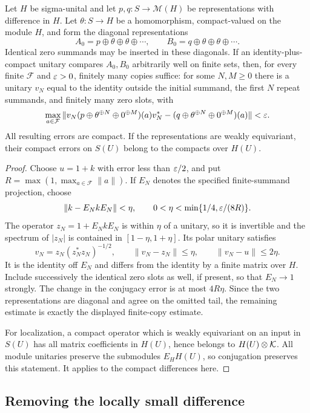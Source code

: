 \begin{lemma}
\label{un:finite-truncation}
Let $H$ be sigma-unital and let $p,q:S\to\mathcal M(H)$ be
representations with difference in $H$.  Let $\theta:S\to H$ be
a homomorphism, compact-valued on the module $H$, and form the diagonal
representations
\[
 A_0=p\oplus\theta\oplus\theta\oplus\cdots,
 \qquad B_0=q\oplus\theta\oplus\theta\oplus\cdots.
\]
Identical zero summands may be inserted in these diagonals.
If an identity-plus-compact unitary compares $A_0,B_0$ arbitrarily
well on finite sets, then, for every finite $\mathcal F$ and
$\varepsilon>0$, finitely many copies suffice: for some $N,M\geq0$ there is a
unitary $v_N$ equal to the identity outside the initial summand,
the first $N$ repeat summands, and finitely many zero slots, with
\[
 \max_{a\in\mathcal F}
 \|v_N(p\oplus\theta^{\oplus N}\oplus0^{\oplus M})(a)v_N^*
       -(q\oplus\theta^{\oplus N}\oplus0^{\oplus M})(a)\|<\varepsilon.
\]
All resulting errors are compact.  If the representations are
weakly equivariant, their compact errors on $S(U)$ belong to the
compacts over $H(U)$.
\end{lemma}

\begin{proof}
Choose $u=1+k$ with error less than $\varepsilon/2$, and put
$R=\max(1,\max_{a\in\mathcal F}\|a\|)$.  If $E_N$ denotes the
specified finite-summand projection, choose
\[
 \|k-E_NkE_N\|<\eta,
 \qquad 0<\eta<\min\{1/4,\varepsilon/(8R)\}.
\]
The operator $z_N=1+E_NkE_N$ is within $\eta$ of a unitary, so it
is invertible and the spectrum of $|z_N|$ is contained in
$[1-\eta,1+\eta]$.  Its polar unitary satisfies
\[
 v_N=z_N(z_N^*z_N)^{-1/2},\qquad
 \|v_N-z_N\|\leq\eta,
 \qquad\|v_N-u\|\leq2\eta.
\]
It is the identity off $E_N$ and differs from the identity by a
finite matrix over $H$.  Include successively the identical zero
slots as well, if present, so that $E_N\to1$ strongly.  The change
in the conjugacy error is at most $4R\eta$.  Since the two
representations are diagonal and agree on the omitted tail, the
remaining estimate is exactly the displayed finite-copy estimate.

For localization, a compact operator which is weakly equivariant
on an input in $S(U)$ has all matrix coefficients in $H(U)$,
hence belongs to $H(U)\otimes\mathcal K$.  All module unitaries preserve
the submodules $E_HH(U)$, so conjugation preserves this statement.
It applies to the compact differences here.
\end{proof}

\subsection{Removing the locally small difference}

